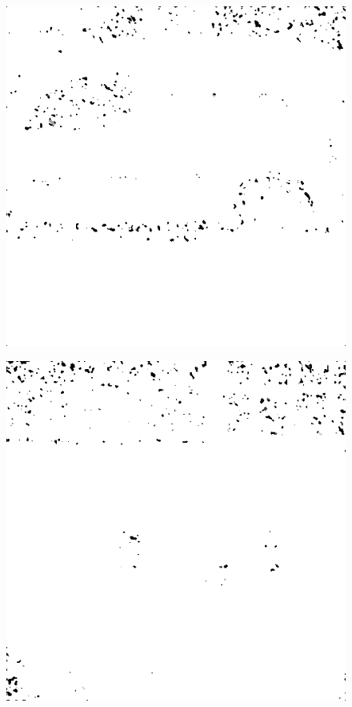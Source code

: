 \begin{figure}[H]
\begin{minipage}[t]{0.3\linewidth} %
	\includegraphics[width = 1\linewidth]{gfx/car/car_m25.png}
	\label{fig:car_m25}
\end{minipage}
\begin{minipage}[t]{0.3\linewidth} %
	\includegraphics[width = 1\linewidth]{gfx/hus/hus_m25.png}

\end{minipage}
\end{figure}
